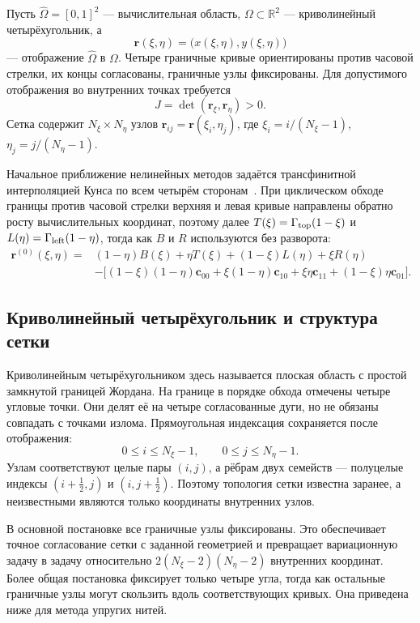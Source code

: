 \documentclass[11pt,a4paper]{article}
\newcommand{\vect}[1]{\boldsymbol{#1}}
\newcommand{\R}{\mathbb{R}}
\begin{document}
Пусть \(\widehat\Omega=[0,1]^2\) --- вычислительная область,
\(\Omega\subset\R^2\) --- криволинейный четырёхугольник, а
\[
 \vect r(\xi,\eta)=\bigl(x(\xi,\eta),y(\xi,\eta)\bigr)
\]
--- отображение \(\widehat\Omega\) в \(\Omega\). Четыре граничные кривые
ориентированы против часовой стрелки, их концы согласованы, граничные узлы
фиксированы. Для допустимого отображения во внутренних точках требуется
\begin{equation}
 J=\det(\vect r_\xi,\vect r_\eta)>0.
 \label{eq:positive-j}
\end{equation}
Сетка содержит \(N_\xi\times N_\eta\) узлов
\(\vect r_{ij}=\vect r(\xi_i,\eta_j)\), где
\(\xi_i=i/(N_\xi-1)\), \(\eta_j=j/(N_\eta-1)\).

Начальное приближение нелинейных методов задаётся трансфинитной
интерполяцией Кунса по всем четырём сторонам~\cite{coons1967}. При циклическом обходе
границы против часовой стрелки верхняя и левая кривые направлены обратно
росту вычислительных координат, поэтому далее
\(T(\xi)=\Gamma_{\rm top}(1-\xi)\) и
\(L(\eta)=\Gamma_{\rm left}(1-\eta)\), тогда как \(B\) и \(R\)
используются без разворота:
\begin{align}
\vect r^{(0)}(\xi,\eta)
={}&(1-\eta)B(\xi)+\eta T(\xi)+(1-\xi)L(\eta)+\xi R(\eta)
\nonumber\\
&-\bigl[(1-\xi)(1-\eta)\vect c_{00}
 +\xi(1-\eta)\vect c_{10}
 +\xi\eta\vect c_{11}
 +(1-\xi)\eta\vect c_{01}\bigr].
\label{eq:coons}
\end{align}

\subsection{Криволинейный четырёхугольник и структура сетки}

Криволинейным четырёхугольником здесь называется плоская область с
простой замкнутой границей Жордана. На границе в порядке обхода отмечены
четыре угловые точки. Они делят её на четыре согласованные дуги, но не
обязаны совпадать с точками излома.
Прямоугольная индексация сохраняется после отображения:
\[
 0\le i\le N_\xi-1,\qquad 0\le j\le N_\eta-1.
\]
Узлам соответствуют целые пары \((i,j)\), а рёбрам двух семейств ---
полуцелые индексы \((i+\tfrac12,j)\) и
\((i,j+\tfrac12)\). Поэтому топология сетки известна заранее, а
неизвестными являются только координаты внутренних узлов.

В основной постановке все граничные узлы фиксированы. Это обеспечивает
точное согласование сетки с заданной геометрией и превращает
вариационную задачу в задачу относительно
\(2(N_\xi-2)(N_\eta-2)\) внутренних координат. Более общая постановка
фиксирует только четыре угла, тогда как остальные граничные узлы могут
скользить вдоль соответствующих кривых. Она приведена ниже для метода
упругих нитей.
\end{document}
